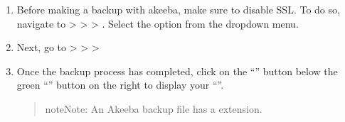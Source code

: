 \documentclass[a4paper,10pt,english,openany,oneside]{sphinxmanual}
\begin{document}
\begin{enumerate}
\begin{quote}
\begin{figure}[H]
\noindent{}
\end{figure}
\end{quote}

\item {} 
\sphinxAtStartPar
Before making a backup with akeeba, make sure to \label{\detokenize{joomla-to-vps:disable-ssl}}disable SSL. To do so, navigate to  >  >  > . Select the option  from the drop\sphinxhyphen{}down menu.
\begin{quote}

\begin{figure}[H]
\centering

\noindent{}
\end{figure}

\newpage
\end{quote}

\item {} 
\sphinxAtStartPar
Next, go to  >  >  > 
\begin{quote}

\begin{figure}[H]
\centering

\noindent{}
\end{figure}
\end{quote}

\item {} 
\sphinxAtStartPar
Once the backup process has completed, click on the “” button below the green “” button on the right to display your “”.
\begin{quote}

\begin{sphinxadmonition}{note}{Note:}
\sphinxAtStartPar
An Akeeba backup file has a  extension.
\end{sphinxadmonition}

\begin{figure}[H]
\centering

\noindent{}
\end{figure}
\end{quote}


\end{enumerate}
\end{document}
